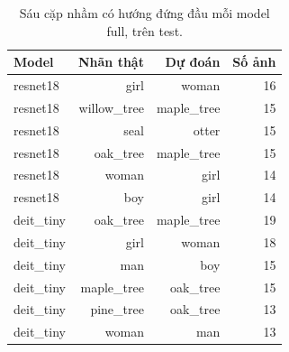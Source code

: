 \begin{table}[htbp]
\centering\small
\caption{Sáu cặp nhầm có hướng đứng đầu mỗi model full, trên test.}\label{tab:A1errors}
\begin{lrbox}{\reporttable}\begin{tabular}{lrrr}
\toprule
Model & Nhãn thật & Dự đoán & Số ảnh \\
\midrule
resnet18 & girl & woman & 16 \\
resnet18 & willow\_tree & maple\_tree & 15 \\
resnet18 & seal & otter & 15 \\
resnet18 & oak\_tree & maple\_tree & 15 \\
resnet18 & woman & girl & 14 \\
resnet18 & boy & girl & 14 \\
deit\_tiny & oak\_tree & maple\_tree & 19 \\
deit\_tiny & girl & woman & 18 \\
deit\_tiny & man & boy & 15 \\
deit\_tiny & maple\_tree & oak\_tree & 15 \\
deit\_tiny & pine\_tree & oak\_tree & 13 \\
deit\_tiny & woman & man & 13 \\
\bottomrule
\end{tabular}\end{lrbox}
\ifdim\wd\reporttable>\linewidth\resizebox{\linewidth}{!}{\usebox{\reporttable}}\else\usebox{\reporttable}\fi
\end{table}
